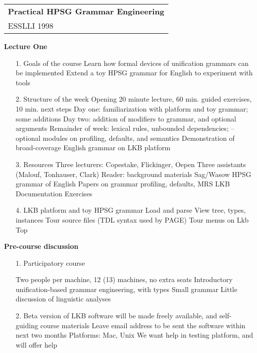 \documentclass[10pt]{article}
\begin{document}
\begin{tabular}[t]{@{}l@{}}
\textbf{Practical HPSG Grammar Engineering}\\
ESSLLI 1998
\end{tabular}

\bigskip
\noindent
{\bf Lecture One}

\begin{itemize}

\item[1.] Goals of the course
\subitem Learn how formal devices of unification grammars can be implemented
\subitem Extend a toy HPSG grammar for English to experiment with tools

\item[2.] Structure of the week
\subitem Opening 20 minute lecture, 60 min. guided exercises, 10 min. next steps
\subitem Day one: familiarization with platform and toy grammar; some additions
\subitem Day two: addition of modifiers to grammar, and optional arguments
\subitem Remainder of week: lexical rules, unbounded dependencies;
\subitem -- optional modules on profiling, defaults, and semantics
\subitem Demonstration of broad-coverage English grammar on LKB platform
     
\item[3.] Resources
\subitem Three lecturers: Copestake, Flickinger, Oepen
\subitem Three assistants (Malouf, Tonhauser, Clark)
\subitem Reader: background materials
\subitem Sag/Wasow HPSG grammar of English
\subitem Papers on grammar profiling, defaults, MRS
\subitem LKB Documentation
\subitem Exercises

\item[4.] LKB platform and toy HPSG grammar
\subitem Load and parse
\subitem View tree, types, instances
\subitem Tour source files (TDL syntax used by PAGE)
\subitem Tour menus on Lkb Top

\end{itemize}

\bigskip
\noindent
{\bf Pre-course discussion}

\begin{itemize}

\item[1.] Participatory course 

\subitem Two people per machine, 12 (13) machines, no extra seats
\subitem Introductory unification-based grammar engineering, with types
\subitem Small grammar
\subitem Little discussion of linguistic analyses

\item[2.] Beta version of LKB software will be made freely available, and 
   self-guiding course materials
\subitem Leave email address to be sent the software within next two months
\subitem Platforms: Mac, Unix
\subitem We want help in testing platform, and will offer help

\end{itemize}
\end{document}

